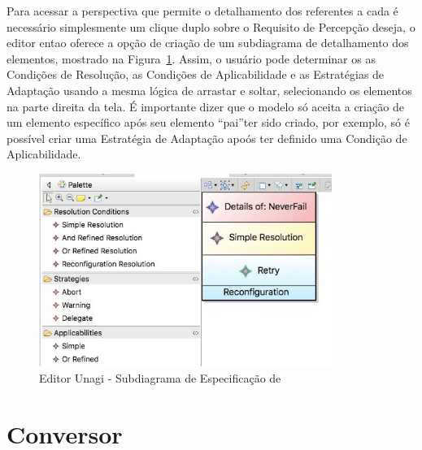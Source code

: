 Para acessar a perspectiva que permite o detalhamento dos \evoreqs referentes a cada \awreq é necessário simplesmente um clique duplo sobre o Requisito de Percepção deseja, o editor entao oferece a opção de criação de um subdiagrama de detalhamento dos elementos, mostrado na Figura~\ref{figura-subdiagrama-awreq}. Assim, o usuário pode determinar os as Condições de Resolução, as Condições de Aplicabilidade e as Estratégias de Adaptação usando a mesma lógica de arrastar e soltar, selecionando os elementos na parte direita da tela. É importante dizer que o modelo só aceita a criação de um elemento específico após seu elemento ``pai''ter sido criado, por exemplo, só é possível criar uma Estratégia de Adaptação apoós ter definido uma Condição de Aplicabilidade.

\begin{figure}[h]
	\centering
	\includegraphics[width=0.85\textwidth]{figuras/unagi/unagisubdiagrama.jpg}
	\caption{Editor Unagi - Subdiagrama de Especificação de \evoreqs}
	\label{figura-subdiagrama-awreq}
\end{figure}

\section{Conversor}
